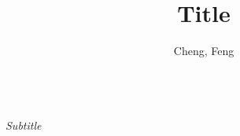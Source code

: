 \documentclass[11pt]{article}
\title{Title}
\author{Cheng, Feng}
\begin{document}
\makeatletter
\begin{center}
    {\Large \@title}
    \\\textit{Subtitle}
    \vspace{0.5em}
    \\ \@author
    \vspace{-0.5em}
\end{center}
\makeatother
\end{document}
